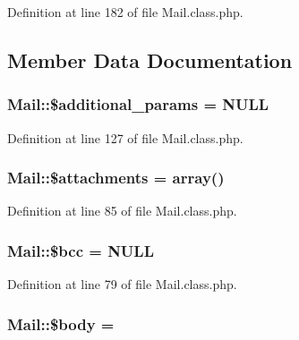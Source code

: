 Definition at line 182 of file Mail.\+class.\+php.



\subsection{Member Data Documentation}
\hypertarget{classMail_a38466de017089677f088c9a4025f724f}{}
\subsubsection[{\$additional\+\_\+params}]{\setlength{\rightskip}{0pt plus 5cm}Mail\+::\$additional\+\_\+params = N\+U\+L\+L}\label{classMail_a38466de017089677f088c9a4025f724f}


Definition at line 127 of file Mail.\+class.\+php.

\hypertarget{classMail_a93b05b1003cc8ea16b59c00d77f47466}{}
\subsubsection[{\$attachments}]{\setlength{\rightskip}{0pt plus 5cm}Mail\+::\$attachments = array()}\label{classMail_a93b05b1003cc8ea16b59c00d77f47466}


Definition at line 85 of file Mail.\+class.\+php.

\hypertarget{classMail_a2e25b3c43459422d40765d581b165692}{}
\subsubsection[{\$bcc}]{\setlength{\rightskip}{0pt plus 5cm}Mail\+::\$bcc = N\+U\+L\+L}\label{classMail_a2e25b3c43459422d40765d581b165692}


Definition at line 79 of file Mail.\+class.\+php.

\hypertarget{classMail_acbd542849121b33a76ed63e1c4670e02}{}
\subsubsection[{\$body}]{\setlength{\rightskip}{0pt plus 5cm}Mail\+::\$body = \textquotesingle{}\textquotesingle{}}\label{classMail_acbd542849121b33a76ed63e1c4670e02}


